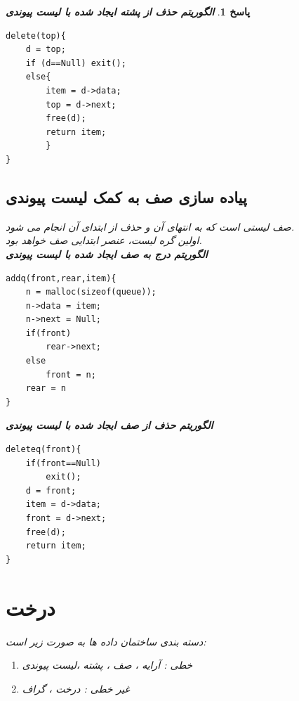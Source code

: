 \documentclass[12pt]{article}
\newtheorem{answer}{پاسخ}[section]
\begin{document}
\begin{answer}
\textbf{الگوریتم حذف از پشته ایجاد شده با لیست پیوندی}
\begin{latin}
\begin{lstlisting}
delete(top){
	d = top;
	if (d==Null) exit();
	else{
		item = d->data;
		top = d->next;
		free(d);
		return item;
		}
}
\end{lstlisting}
\end{latin}

\newpage

\subsection{پیاده سازی صف به کمک لیست پیوندی}
صف لیستی است که به انتهای آن و حذف از ابتدای آن انجام می شود.\\
اولین گره لیست، عنصر ابتدایی صف خواهد بود.\\
\newline
\textbf{الگوریتم درج به صف ایجاد شده با لیست پیوندی}
\begin{latin}
\begin{lstlisting}
addq(front,rear,item){
	n = malloc(sizeof(queue));
	n->data = item;
	n->next = Null;
	if(front)
		rear->next;
	else
		front = n;
	rear = n
}
\end{lstlisting}
\end{latin}

\textbf{الگوریتم حذف از صف ایجاد شده با لیست پیوندی}
\begin{latin}
\begin{lstlisting}
deleteq(front){
	if(front==Null)
		exit();
	d = front;
	item = d->data;
	front = d->next;
	free(d);
	return item;
}
\end{lstlisting}
\end{latin}
\newpage

\section{درخت}
دسته بندی ساختمان داده ها به صورت زیر است:
\begin{enumerate}
	\item 
خطی : آرایه ، صف ، پشته ،لیست پیوندی
	\item
غیر خطی : درخت ، گراف 
\end{enumerate}

\end{answer}
\end{document}
